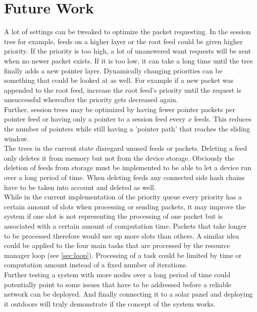 \section{Future Work}
\label{sec:futurework}
A lot of settings can be tweaked to optimize the packet requesting. In the session tree for example, feeds on a higher layer or the root feed could be given higher priority. If the priority is too high, a lot of unanswered want requests will be sent when no newer packet exists. If it is too low, it can take a long time until the tree finally adds a new pointer layer. Dynamically changing priorities can be something that could be looked at as well. For example if a new packet was appended to the root feed, increase the root feed's priority until the request is unsuccessful whereafter the priority gets decreased again. \\
Further, session trees may be optimized by having fewer pointer packets per pointer feed or having only a pointer to a session feed every $x$ feeds. This reduces the number of pointers while still having a 'pointer path' that reaches the sliding window. \\
The trees in the current state disregard unused feeds or packets. Deleting a feed only deletes it from memory but not from the device storage. Obviously the deletion of feeds from storage must be implemented to be able to let a device run over a long period of time. When deleting feeds any connected side hash chains have to be taken into account and deleted as well.\\
While in the current implementation of the priority queue every priority has a certain amount of slots when processing or sending packets, it may improve the system if one slot is not representing the processing of one packet but is associated with a certain amount of computation time. Packets that take longer to be processed therefore would use up more slots than others. A similar idea could be applied to the four main tasks that are processed by the resource manager loop (see \cref{sec:loop}). Processing of a task could be limited by time or computation amount instead of a fixed number of iterations. \\
Further testing a system with more nodes over a long period of time could potentially point to some issues that have to be addressed before a reliable network can be deployed. And finally connecting it to a solar panel and deploying it outdoors will truly demonstrate if the concept of the system works. \\
